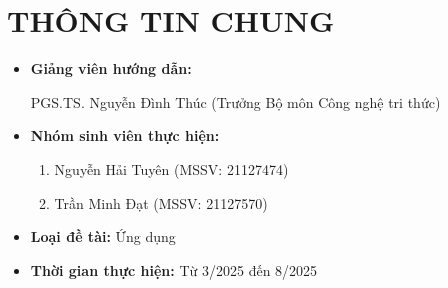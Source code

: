 \documentclass{article}[14pt]
\begin{document}
    \section{THÔNG TIN CHUNG}
    \begin{itemize}[label = {}]
        
        \item \textbf{Giảng viên hướng dẫn:} 
        \begin{itemize}
            PGS.TS. Nguyễn Đình Thúc (Trưởng Bộ môn Công nghệ tri thức)
        \end{itemize}{}
    
        
        \item \textbf{Nhóm sinh viên thực hiện:}
        \begin{enumerate}
            \item Nguyễn Hải Tuyên (MSSV: 21127474) 
            \item Trần Minh Đạt (MSSV: 21127570)
        \end{enumerate}

        \item \textbf{Loại đề tài:} Ứng dụng
        
        \item \textbf{Thời gian thực hiện:} Từ 3/2025 đến 8/2025
        
    \end{itemize}
    
    \pagebreak 
    
\end{document}
